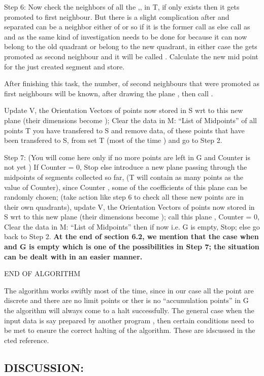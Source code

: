 \documentclass[english]{article}
\begin{document}
Step 6: Now check the neighbors of all the  ,, in T,
if only  exists then it gets promoted to first neighbour.
But there is a slight complication after  and 
separated  can be a neighbor either of  or 
so if it is the former call  as  else call   as
 and  as   the same kind of investigation needs
to be done for  because it can now belong to the old   
quadrant or belong to the new  quadrant, in either case the
 gets promoted as second neighbour and it will be called .
Calculate the new mid point  for the just created segment
 and store.

After finishing this task, the number,  of second neighbours that
were promoted as first neighbours will be known, after drawing the
plane , then call .

Update V, the Orientation Vectors of points now stored in S wrt to
this new plane (their dimensions become ); Clear the data in
M: {}``List of Midpoints'' of all points T you have transfered to
S and remove data, of these  points that have been transfered
to S, from set T (most of the time ) and go to Step 2.

Step 7: (You will come here only if no more points are left in G 
and Counter is not yet  ) If Counter = 0, Stop else introduce
a new plane passing through the midpoints of segments collected so
far, (T will contain as many points as the value of Counter), since
Counter , some of the coefficients of this plane can be randomly
chosen; (take action like step 6 to check all these new points are
in their own quadrants), update V, the Orientation Vectors of points
now stored in S wrt to this new plane (their dimensions become );
call this plane , Counter = 0, Clear the data in M: {}``List
of Midpoints'' then if now  i.e. G is empty, Stop; else
go back to Step 2. \textbf{At the end of section 6.2, we mention that
the case when  and G is empty which is one of the possibilities
in Step 7; the situation can be dealt with in an easier manner.}

END OF ALGORITHM

The algorithm works swiftly most of the time, since in our case all
the point are discrete and there are no limit points or ther is no
{}``accumulation points'' in G the algorithm will always come to
a halt successfully. The general case when the input data is say prepared
by another program , then certain conditions need to be met to ensure
the correct halting of the algorithm. These are idscussed in the cted
reference.


\subsection*{DISCUSSION:}
\end{document}
